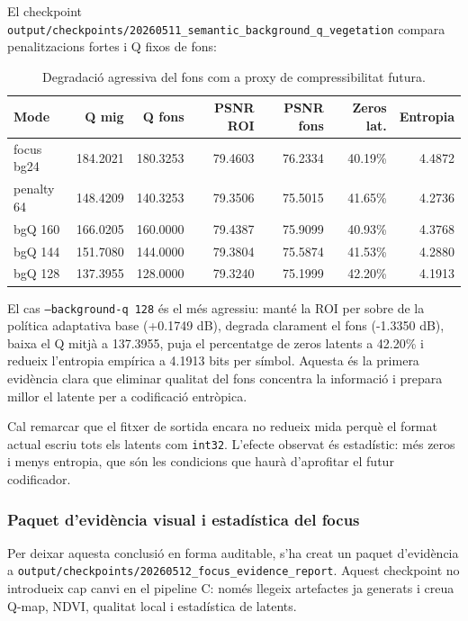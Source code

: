 \documentclass[11pt,a4paper]{article}
\begin{document}
El checkpoint \texttt{output/checkpoints/20260511\_semantic\_background\_q\_vegetation} compara penalitzacions fortes i Q fixos de fons:

\begin{table}[H]
\centering
\begin{tabular}{lrrrrrr}
\toprule
\textbf{Mode} & \textbf{Q mig} & \textbf{Q fons} & \textbf{PSNR ROI} & \textbf{PSNR fons} & \textbf{Zeros lat.} & \textbf{Entropia} \\
\midrule
focus bg24 & 184.2021 & 180.3253 & 79.4603 & 76.2334 & 40.19\% & 4.4872 \\
penalty 64 & 148.4209 & 140.3253 & 79.3506 & 75.5015 & 41.65\% & 4.2736 \\
bgQ 160 & 166.0205 & 160.0000 & 79.4387 & 75.9099 & 40.93\% & 4.3768 \\
bgQ 144 & 151.7080 & 144.0000 & 79.3804 & 75.5874 & 41.53\% & 4.2880 \\
bgQ 128 & 137.3955 & 128.0000 & 79.3240 & 75.1999 & 42.20\% & 4.1913 \\
\bottomrule
\end{tabular}
\caption{Degradació agressiva del fons com a proxy de compressibilitat futura.}
\end{table}

El cas \texttt{--background-q 128} és el més agressiu: manté la ROI per sobre de la política adaptativa base (+0.1749 dB), degrada clarament el fons (-1.3350 dB), baixa el Q mitjà a 137.3955, puja el percentatge de zeros latents a 42.20\% i redueix l'entropia empírica a 4.1913 bits per símbol. Aquesta és la primera evidència clara que eliminar qualitat del fons concentra la informació i prepara millor el latente per a codificació entròpica.

Cal remarcar que el fitxer de sortida encara no redueix mida perquè el format actual escriu tots els latents com \texttt{int32}. L'efecte observat és estadístic: més zeros i menys entropia, que són les condicions que haurà d'aprofitar el futur codificador.

\subsubsection{Paquet d'evidència visual i estadística del focus}

Per deixar aquesta conclusió en forma auditable, s'ha creat un paquet d'evidència a \texttt{output/checkpoints/20260512\_focus\_evidence\_report}. Aquest checkpoint no introdueix cap canvi en el pipeline C: només llegeix artefactes ja generats i creua Q-map, NDVI, qualitat local i estadística de latents.
\end{document}
